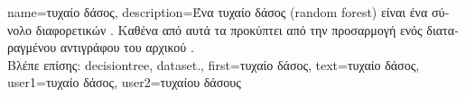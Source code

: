 {name={\foreignlanguage{greek}{τυχαίο δάσος}},
	description={\foreignlanguage{greek}{Ένα τυχαίο δάσος} (random forest) 
		\foreignlanguage{greek}{είναι ένα σύνολο διαφορετικών} . 
		\foreignlanguage{greek}{Καθένα από αυτά τα}  \foreignlanguage{greek}{προκύπτει από την προσαρμογή 
		ενός διαταραγμένου αντιγράφου του αρχικού} .\\
		\foreignlanguage{greek}{Βλέπε επίσης:} \gls{decisiontree}, \gls{dataset}.},
	first={\foreignlanguage{greek}{τυχαίο δάσος}}, 
	text={\foreignlanguage{greek}{τυχαίο δάσος}},
	user1={\foreignlanguage{greek}{τυχαίο δάσος}}, %
	user2={\foreignlanguage{greek}{τυχαίου δάσους}} %
}

